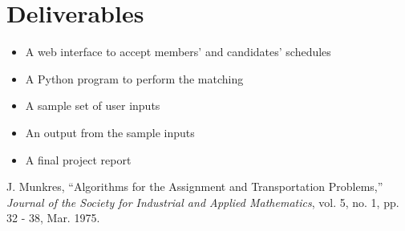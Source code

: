 \documentclass[letterpaper, 12pt]{article}
\begin{document}
\section*{Deliverables}
\begin{itemize}
    \item A web interface to accept members' and candidates' schedules
    \item A Python program to perform the matching
    \item A sample set of user inputs
    \item An output from the sample inputs
    \item A final project report
\end{itemize}


\begin{thebibliography}{9}
        J. Munkres,
        ``Algorithms for the Assignment and Transportation Problems,''
        \emph{Journal of the Society for Industrial and Applied Mathematics},
        vol. 5, no. 1, pp. 32 - 38, Mar. 1975.
\end{thebibliography}
\end{document}
